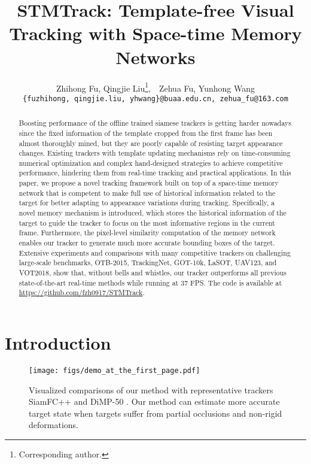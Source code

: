 \documentclass[final]{cvpr}
\begin{document}
\title{STMTrack: Template-free Visual Tracking with Space-time Memory Networks}

\author{Zhihong Fu, Qingjie Liu\thanks{Corresponding author.},\ \ Zehua Fu, Yunhong Wang\\
{\tt\small \{fuzhihong, qingjie.liu, yhwang\}@buaa.edu.cn, zehua\_fu@163.com}
}

\maketitle

\pagestyle{empty}  \thispagestyle{empty} 

\begin{abstract}
Boosting performance of the offline trained siamese trackers is getting harder nowadays since the fixed information of the template cropped from the first frame has been almost thoroughly mined, but they are poorly capable of resisting target appearance changes.
Existing trackers with template updating mechanisms rely on time-consuming numerical optimization and complex hand-designed strategies to achieve competitive performance, hindering them from real-time tracking and practical applications.
In this paper, we propose a novel tracking framework built on top of a space-time memory network that is competent to make full use of historical information related to the target for better adapting to appearance variations during tracking.
Specifically, a novel memory mechanism is introduced, which stores the historical information of the target to guide the tracker to focus on the most informative regions in the current frame.
Furthermore, the pixel-level similarity computation of the memory network enables our tracker to generate much more accurate bounding boxes of the target.
Extensive experiments and comparisons with many competitive trackers on challenging large-scale benchmarks, OTB-2015, TrackingNet, GOT-10k, LaSOT, UAV123, and VOT2018, show that, without bells and whistles, our tracker outperforms all previous state-of-the-art real-time methods while running at 37 FPS.
The code is available at \url{https://github.com/fzh0917/STMTrack}.
\end{abstract}

\section{Introduction}
\begin{figure}[t]
    \centering
    \texttt{[image: figs/demo\_at\_the\_first\_page.pdf]}
    \vspace{-1.0em}
    \caption{Visualized comparisons of our method with representative trackers SiamFC++ \cite{xu2020siamfc++} and DiMP-50 \cite{bhat2019learning}. Our method can estimate more accurate target state when targets suffer from partial occlusions and non-rigid deformations.}
    \label{fig:demo_at_the_first_page_fig}
 \vspace{-1.0em}
\end{figure}
\end{document}
